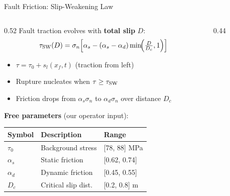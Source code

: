 \documentclass[aspectratio=169,12pt]{beamer}
\begin{document}
\begin{frame}{Fault Friction: Slip-Weakening Law}
  \begin{columns}[T]
    \begin{column}{0.52\textwidth}
      Fault traction evolves with \textbf{total slip} $D$:
      \[
        \tau_{\rm SW}(D) = \sigma_n\Bigl[\alpha_s - (\alpha_s-\alpha_d)\min\!\Bigl(\tfrac{D}{D_c},1\Bigr)\Bigr]
      \]
      \begin{itemize}
        \item $\tau = \tau_0 + s_l(x_f,t)$ \quad (traction from left)
        \item Rupture nucleates when $\tau \ge \tau_{\rm SW}$
        \item Friction drops from $\alpha_s \sigma_n$ to $\alpha_d \sigma_n$ over distance $D_c$
      \end{itemize}
      \vspace{6pt}
      \textbf{Free parameters} (our operator input):
      \begin{center}
      \small
      \begin{tabular}{lll}
        \toprule
        Symbol & Description & Range \\
        \midrule
        $\tau_0$ & Background stress & [78, 88] MPa \\
        $\alpha_s$ & Static friction & [0.62, 0.74] \\
        $\alpha_d$ & Dynamic friction & [0.45, 0.55] \\
        $D_c$ & Critical slip dist. & [0.2, 0.8] m \\
        \bottomrule
      \end{tabular}
      \end{center}
    \end{column}
    \begin{column}{0.44\textwidth}
    \end{column}
  \end{columns}
\end{frame}
\end{document}
